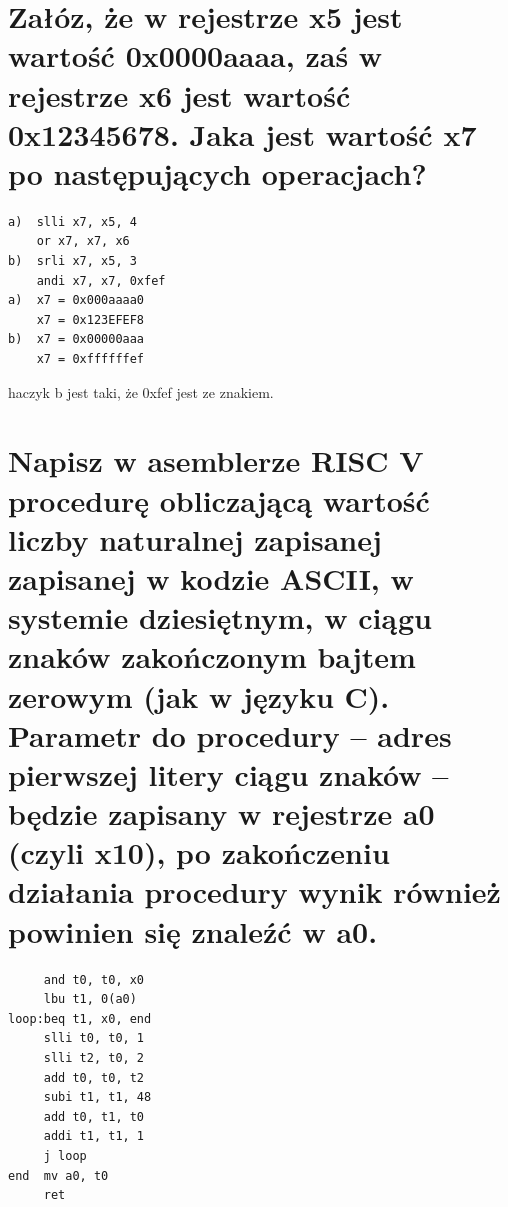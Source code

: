 \documentclass{article}
\begin{document}
\section{Załóz, że w rejestrze x5 jest wartość 0x0000aaaa, zaś w rejestrze x6 jest wartość 0x12345678. Jaka jest wartość x7 po następujących operacjach?}
\begin{lstlisting}
a)  slli x7, x5, 4
	or x7, x7, x6
b)  srli x7, x5, 3
	andi x7, x7, 0xfef
a)	x7 = 0x000aaaa0
	x7 = 0x123EFEF8
b)	x7 = 0x00000aaa
	x7 = 0xffffffef
\end{lstlisting}
haczyk b jest taki, że 0xfef jest ze znakiem.
\section{Napisz w asemblerze RISC V procedurę obliczającą wartość liczby naturalnej zapisanej zapisanej w kodzie ASCII, w systemie dziesiętnym, w ciągu znaków zakończonym bajtem zerowym (jak w języku C). Parametr do procedury –  adres pierwszej litery ciągu znaków – będzie zapisany w rejestrze a0 (czyli x10), po zakończeniu działania procedury wynik również powinien się znaleźć w a0.}
\begin{lstlisting}
	 and t0, t0, x0
	 lbu t1, 0(a0)
loop:beq t1, x0, end
     slli t0, t0, 1
     slli t2, t0, 2
     add t0, t0, t2
     subi t1, t1, 48
     add t0, t1, t0
     addi t1, t1, 1
     j loop
end  mv a0, t0
	 ret

\end{lstlisting}
\end{document}
